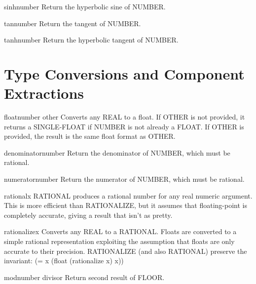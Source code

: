 \documentclass[10pt,english]{book}
\begin{document}
\begin{function}{sinh}{number}
  Return the hyperbolic sine of NUMBER.
\end{function}

\begin{function}{tan}{number}
  Return the tangent of NUMBER.
\end{function}

\begin{function}{tanh}{number}
  Return the hyperbolic tangent of NUMBER.
\end{function}

\section{Type Conversions and Component Extractions}
\label{sec:type-conv-comp}

\begin{function}{float}{number \op other}
  Converts any REAL to a float. If OTHER is not provided, it returns a
  SINGLE-FLOAT if NUMBER is not already a FLOAT. If OTHER is provided, the
  result is the same float format as OTHER.
\end{function}

\begin{function}{denominator}{number}
  Return the denominator of NUMBER, which must be rational.
\end{function}

\begin{function}{numerator}{number}
  Return the numerator of NUMBER, which must be rational.
\end{function}

\begin{function}{rational}{x}
  RATIONAL produces a rational number for any real numeric argument. This is
  more efficient than RATIONALIZE, but it assumes that floating-point is
  completely accurate, giving a result that isn't as pretty.
\end{function}

\begin{function}{rationalize}{x}
  Converts any REAL to a RATIONAL.  Floats are converted to a simple rational
  representation exploiting the assumption that floats are only accurate to
  their precision.  RATIONALIZE (and also RATIONAL) preserve the invariant:
      (= x (float (rationalize x) x))
\end{function}

\begin{function}{mod}{number divisor}
  Return second result of FLOOR.
\end{function}
\end{document}
